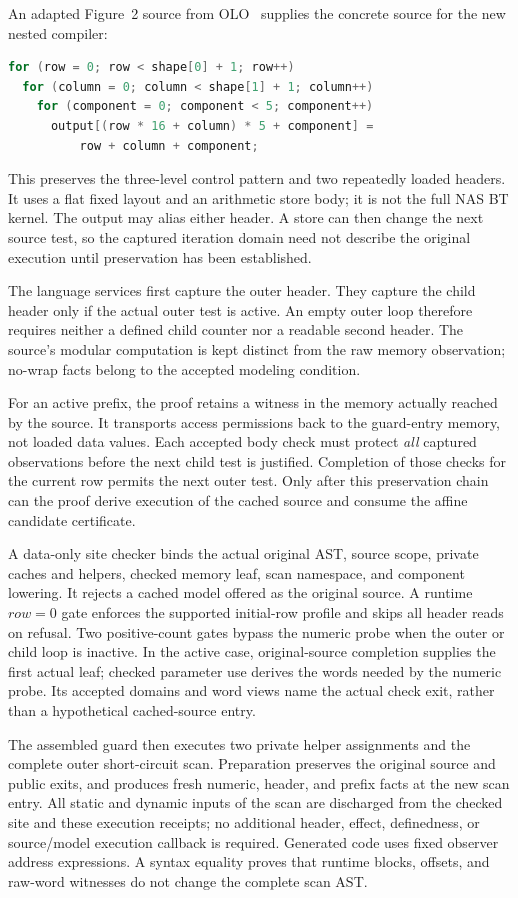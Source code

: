 An adapted Figure~2 source from OLO~\cite{olo2017} supplies the concrete
source for the new nested compiler:
\begin{lstlisting}[language=C]
for (row = 0; row < shape[0] + 1; row++)
  for (column = 0; column < shape[1] + 1; column++)
    for (component = 0; component < 5; component++)
      output[(row * 16 + column) * 5 + component] =
          row + column + component;
\end{lstlisting}
This preserves the three-level control pattern and two repeatedly loaded
headers. It uses a flat fixed layout and an arithmetic store body; it is not
the full NAS BT kernel. The output may alias either header. A store can then
change the next source test, so the captured iteration domain need not describe
the original execution until preservation has been established.

The language services first capture the outer header. They capture the child
header only if the actual outer test is active. An empty outer loop therefore
requires neither a defined child counter nor a readable second header. The
source's modular  computation is kept distinct from the raw memory
observation; no-wrap facts belong to the accepted modeling condition.

For an active prefix, the proof retains a witness in the memory actually reached
by the source. It transports access permissions back to the guard-entry memory,
not loaded data values. Each accepted body check must protect \emph{all} captured
observations before the next child test is justified. Completion of those checks
for the current row permits the next outer test. Only after this preservation
chain can the proof derive execution of the cached source and consume the
affine candidate certificate.

A data-only site checker binds the actual original AST, source scope, private
caches and helpers, checked memory leaf, scan namespace, and component lowering.
It rejects a cached model offered as the original source. A runtime
\(\mathit{row}=0\) gate enforces the supported initial-row profile and skips all
header reads on refusal. Two positive-count gates bypass the numeric probe when
the outer or child loop is inactive. In the active case, original-source
completion supplies the first actual leaf; checked parameter use derives the
words needed by the numeric probe. Its accepted domains and word views name the
actual check exit, rather than a hypothetical cached-source entry.

The assembled guard then executes two private helper assignments and the
complete outer short-circuit scan. Preparation preserves the original source
and public exits, and produces fresh numeric, header, and prefix facts at the
new scan entry. All static and dynamic inputs of the scan are discharged from
the checked site and these execution receipts; no additional header, effect,
definedness, or source/model execution callback is required. Generated code uses
fixed observer address expressions. A syntax equality proves that runtime
blocks, offsets, and raw-word witnesses do not change the complete scan AST.


